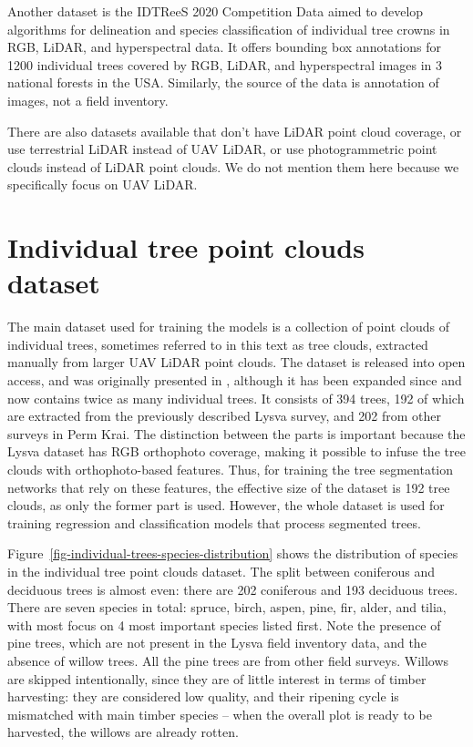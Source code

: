 Another dataset is the IDTReeS 2020 Competition Data \cite{gravesIDTReeS2020Competition2020} aimed to develop algorithms for delineation and species classification of individual tree crowns in RGB, LiDAR, and hyperspectral data.
It offers bounding box annotations for 1200 individual trees covered by RGB, LiDAR, and hyperspectral images in 3 national forests in the USA.
Similarly, the source of the data is annotation of images, not a field inventory.

There are also datasets available that don't have LiDAR point cloud coverage, or use terrestrial LiDAR instead of UAV LiDAR, or use photogrammetric point clouds instead of LiDAR  point clouds.
We do not mention them here because we specifically focus on UAV LiDAR.

\section{Individual tree point clouds dataset}\label{sec-individual-trees-dataset}

The main dataset used for training the models is a collection of point clouds of individual trees, sometimes referred to in this text as tree clouds, extracted manually from larger UAV LiDAR point clouds.
The dataset is released into open access, and was originally presented in \citep{dubrovinExplorationPropertiesPoint2024}, although it has been expanded since and now contains twice as many individual trees.
It consists of 394 trees, 192 of which are extracted from the previously described Lysva survey, and 202 from other surveys in Perm Krai.
The distinction between the parts is important because the Lysva dataset has RGB orthophoto coverage, making it possible to infuse the tree clouds with orthophoto-based features.
Thus, for training the tree segmentation networks that rely on these features, the effective size of the dataset is 192 tree clouds, as only the former part is used.
However, the whole dataset is used for training regression and classification models that process segmented trees.

Figure~\ref{fig-individual-trees-species-distribution} shows the distribution of species in the individual tree point clouds dataset.
The split between coniferous and deciduous trees is almost even: there are 202 coniferous and 193 deciduous trees.
There are seven species in total: spruce, birch, aspen, pine, fir, alder, and tilia, with most focus on 4 most important species listed first.
Note the presence of pine trees, which are not present in the Lysva field inventory data, and the absence of willow trees.
All the pine trees are from other field surveys.
Willows are skipped intentionally, since they are of little interest in terms of timber harvesting: they are considered low quality, and their ripening cycle is mismatched with main timber species – when the overall plot is ready to be harvested, the willows are already rotten.

